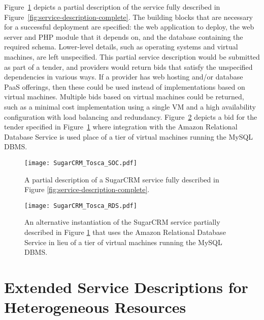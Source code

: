 \documentclass[10pt, conference, compsocconf]{IEEEtran}
\begin{document}
Figure~\ref{fig:service-description-partial} depicts a partial description of the service fully described in Figure~\ref{fig:service-description-complete}. The building blocks that are necessary for a successful deployment are specified: the web application to deploy, the web server and PHP module that it depends on, and the database containing the required schema. Lower-level details, such as operating systems and virtual machines, are left unspecified. This partial service description would be submitted as part of a tender, and providers would return bids that satisfy the unspecified dependencies in various ways. If a provider has web hosting and/or database PaaS offerings, then these could be used instead of implementations based on virtual machines. Multiple bids based on virtual machines could be returned, such as a minimal cost implementation using a single VM and a high availability configuration with load balancing and redundancy. Figure~\ref{fig:service-description-alternate} depicts a bid for the tender specified in Figure~\ref{fig:service-description-partial} where integration with the Amazon Relational Database Service is used place of a tier of virtual machines running the MySQL DBMS.

\begin{figure}
\texttt{[image: SugarCRM\_Tosca\_SOC.pdf]}
\caption{A partial description of a SugarCRM service fully described in Figure \ref{fig:service-description-complete}.}
\label{fig:service-description-partial}
\end{figure}

\begin{figure}
\texttt{[image: SugarCRM\_Tosca\_RDS.pdf]}
\caption{An alternative instantiation of the SugarCRM service partially described in Figure \ref{fig:service-description-partial} that uses the Amazon Relational Database Service in lieu of a tier of virtual machines running the MySQL DBMS.}
\label{fig:service-description-alternate}
\end{figure}


\section{Extended Service Descriptions for Heterogeneous Resources}
\label{sec:extended-descriptions}
\end{document}
